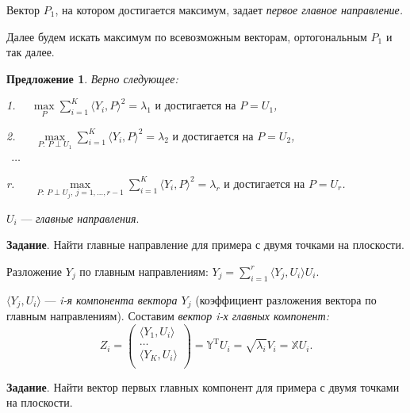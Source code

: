 \documentclass[specialist, 12pt,
subf, %
href, colorlinks=true,
substylefile = spbu.rtx,
]{disser}
\newtheorem{proposition}{Предложение}
\begin{document}
Вектор $P_1$, на котором достигается максимум, задает \textit{первое главное направление.}

Далее будем искать максимум по всевозможным векторам, ортогональным $P_1$ и так далее.

\begin{proposition} Верно следующее:
	
	1. ~~$ \max\limits_P \sum\limits_{i =1}^K \langle Y_i,P\rangle ^2 =\lambda_1 \text{ и достигается на } P=U_1$,

	2. ~~ $\max\limits_{P: ~P\perp U_1} \sum\limits_{i =1}^K \langle Y_i,P\rangle ^2 =\lambda_2 \text{ и достигается на } P=U_2$, \\
	
    $~~\ldots~~$
	
	r. ~~ $\max\limits_{P:~ P\perp U_j,~ j=1,\ldots,r-1} \sum\limits_{i =1}^K \langle Y_i,P\rangle ^2 =\lambda_r \text{ и достигается на } P=U_r$.
\end{proposition}

$U_i$ --- \textit{главные направления}.

\textbf{Задание}. Найти главные направление для примера с двумя точками на плоскости.

Разложение $Y_j$ по главным направлениям: $Y_j=\sum\limits_{i =1}^r \langle Y_j,U_i\rangle U_i.$

$\langle Y_j,U_i\rangle$ --- \textit{i-я компонента вектора $Y_j$} (коэффициент разложения вектора по главным направлениям). Составим \textit{вектор i-х главных компонент:}
\begin{equation*}
Z_i= \left( \begin{matrix}
\langle Y_1,U_i\rangle \\
\ldots\\
\langle Y_K,U_i\rangle\\
\end{matrix} \right) = \mathbb{Y}^\mathrm{T} U_i=\sqrt{\lambda_i} V_i=\mathbb{X}U_i.
\end{equation*}

\textbf{Задание}. Найти вектор первых главных компонент для примера с двумя точками на плоскости.
\end{document}
